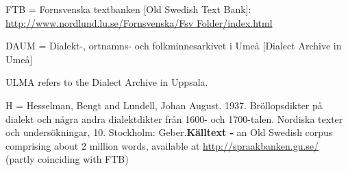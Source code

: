 

FTB = Fornsvenska textbanken [Old Swedish Text Bank]: \url{http://www.nordlund.lu.se/Fornsvenska/Fsv Folder/index.html}

DAUM = Dialekt-, ortnamns- och folkminnesarkivet i Umeå [Dialect Archive in Umeå]

ULMA refers to the Dialect Archive in Uppsala.

H = Hesselman, Bengt and Lundell, Johan August. 1937. Bröllopsdikter på dialekt och några andra dialektdikter från 1600- och 1700-talen. Nordiska texter och undersökningar, 10. Stockholm: Geber.\textbf{Källtext - }an Old Swedish corpus comprising about 2 million words, available at \url{http://spraakbanken.gu.se/} (partly coinciding with FTB)
